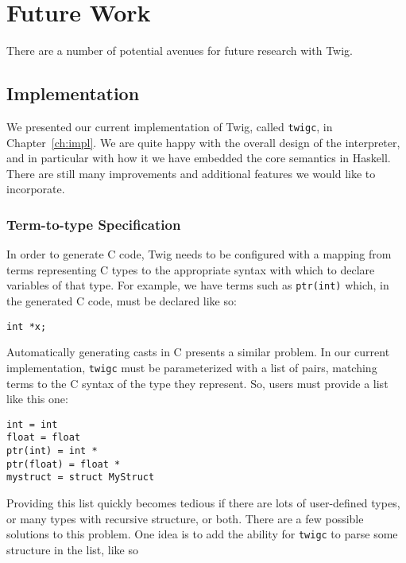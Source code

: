 
\chapter{Future Work}


There are a number of potential avenues for future research with
Twig.

\section{Implementation}

We presented our current implementation of Twig, called
\texttt{twigc}, in Chapter~\ref{ch:impl}. We are quite happy with
the overall design of the interpreter, and in particular with how
it we have embedded the core semantics in Haskell. There are still
many improvements and additional features we would like to
incorporate.

\subsection{Term-to-type Specification}

In order to generate C code, Twig needs to be configured with a
mapping from terms representing C types to the appropriate syntax
with which to declare variables of that type. For example, we have
terms such as \texttt{ptr(int)} which, in the generated C code,
must be declared like so:

\begin{verbatim}
int *x;
\end{verbatim}

Automatically generating casts in C presents a similar problem. In
our current implementation, \texttt{twigc} must be parameterized
with a list of pairs, matching terms to the C syntax of the type
they represent. So, users must provide a list like this one:

\begin{verbatim}
int = int
float = float
ptr(int) = int *
ptr(float) = float *
mystruct = struct MyStruct
\end{verbatim}

Providing this list quickly becomes tedious if there are lots of
user-defined types, or many types with recursive structure, or
both. There are a few possible solutions to this problem. One idea
is to add the ability for \texttt{twigc} to parse some structure
in the list, like so

